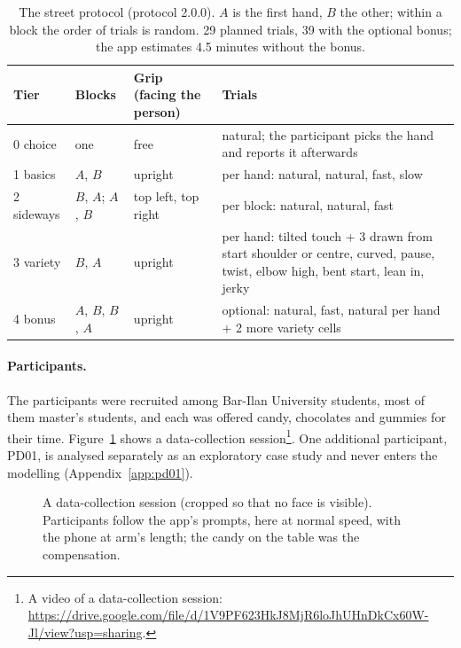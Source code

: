 \begin{table}[htbp]
\centering
\caption{The street protocol (protocol 2.0.0). $A$ is the first hand, $B$ the other; within a block the order
of trials is random. 29 planned trials, 39 with the optional bonus; the app estimates 4.5 minutes without the
bonus.}\label{tab:protocol}
\footnotesize
\begin{tabularx}{\linewidth}{@{}l l l >{\raggedright\arraybackslash}X@{}}
\toprule
Tier & Blocks & Grip (facing the person) & Trials \\
\midrule
0 choice & one & free & 1 natural; the participant picks the hand and reports it afterwards \\
1 basics & $A$, $B$ & upright & 4 per hand: natural, natural, fast, slow \\
2 sideways & $B$, $A$; $A$, $B$ & top left, top right & 3 per block: natural, natural, fast \\
3 variety & $B$, $A$ & upright & 4 per hand: tilted touch + 3 drawn from start shoulder or centre,
  curved, pause, twist, elbow high, bent start, lean in, jerky \\
4 bonus & $A$, $B$, $B$, $A$ & upright & optional: natural, fast, natural per hand + 2 more variety cells \\
\bottomrule
\end{tabularx}
\end{table}

\paragraph{Participants.} The participants were recruited among Bar-Ilan University students, most of them
master's students, and each was offered candy, chocolates and gummies for their time. Figure~\ref{fig:photo} shows
a data-collection session\footnote{\raggedright A video of a data-collection session:
\url{https://drive.google.com/file/d/1V9PF623HkJ8MjR6loJhUHnDkCx60W-Jl/view?usp=sharing}.}. One additional
participant, PD01, is analysed separately as an exploratory case study and never enters the modelling
(Appendix~\ref{app:pd01}).

\begin{figure}[htbp]
\centering
{}
\caption{A data-collection session (cropped so that no face is visible). Participants follow the app's prompts,
here \handL{} at normal speed, with the phone at arm's length; the candy on the table was the compensation.}
\label{fig:photo}
\end{figure}

